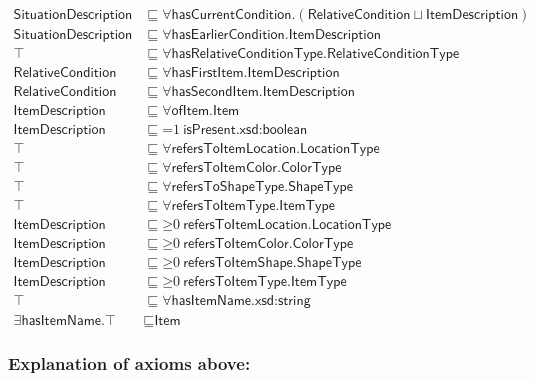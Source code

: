 \begin{align}
\textsf{SituationDescription} &\sqsubseteq \forall \textsf{hasCurrentCondition.}(\textsf{RelativeCondition}\sqcup\textsf{ItemDescription}) \\
\textsf{SituationDescription} &\sqsubseteq \forall \textsf{hasEarlierCondition.ItemDescription} \\
\top &\sqsubseteq \forall\textsf{hasRelativeConditionType.RelativeConditionType} \\
\textsf{RelativeCondition} &\sqsubseteq \forall \textsf{hasFirstItem.ItemDescription} \\
\textsf{RelativeCondition} &\sqsubseteq \forall \textsf{hasSecondItem.ItemDescription} \\
\textsf{ItemDescription} &\sqsubseteq \forall \textsf{ofItem.Item} \\
\textsf{ItemDescription} &\sqsubseteq \mathord{=}1~\textsf{isPresent.xsd:boolean} \\
\top &\sqsubseteq \forall\textsf{refersToItemLocation.LocationType} \\
\top &\sqsubseteq \forall\textsf{refersToItemColor.ColorType} \\
\top &\sqsubseteq \forall\textsf{refersToShapeType.ShapeType} \\
\top &\sqsubseteq \forall\textsf{refersToItemType.ItemType} \\
\textsf{ItemDescription} &\sqsubseteq \mathord{\geq}0~\textsf{refersToItemLocation.LocationType} \\
\textsf{ItemDescription} &\sqsubseteq \mathord{\geq}0~\textsf{refersToItemColor.ColorType} \\
\textsf{ItemDescription} &\sqsubseteq \mathord{\geq}0~\textsf{refersToItemShape.ShapeType} \\
\textsf{ItemDescription} &\sqsubseteq \mathord{\geq}0~\textsf{refersToItemType.ItemType} \\
\top &\sqsubseteq \forall \textsf{hasItemName.xsd:string} \\
\exists\textsf{hasItemName.}\top &\sqsubseteq \textsf{Item}
\end{align}

\subsubsection*{Explanation of axioms above:}

